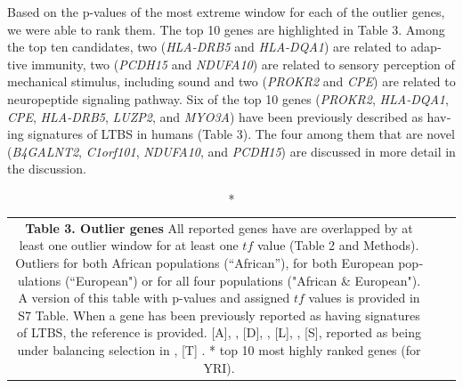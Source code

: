 \begin{refsection}
\begin{otherlanguage}{english}
Based on the p-values of the most extreme window for each of the outlier genes, we were able to rank them. The top 10 genes are highlighted in Table 3. Among the top ten candidates, two (\emph{HLA-DRB5} and \emph{HLA-DQA1}) are related to adaptive immunity, two (\emph{PCDH15} and \emph{NDUFA10}) are related to sensory perception of mechanical stimulus, including sound and two (\emph{PROKR2} and \emph{CPE}) are related to neuropeptide signaling pathway. Six of the top 10 genes (\emph{PROKR2}, \emph{HLA-DQA1}, \emph{CPE}, \emph{HLA-DRB5}, \emph{LUZP2}, and \emph{MYO3A}) have been previously described as having signatures of LTBS in humans (Table 3). The four among them that are novel (\emph{B4GALNT2}, \emph{C1orf101}, \emph{NDUFA10}, and \emph{PCDH15}) are discussed in more detail in the discussion.

\begin{scriptsize}
\begin{longtable}{ccc}
\caption*{\textbf{Table 3. Outlier genes} All reported genes have are overlapped by at least one outlier window for at least one $tf$ value (Table 2 and Methods). Outliers for both African populations (“African”), for both European populations (“European") or for all four populations ("African \& European"). A version of this table with p-values and assigned $tf$ values is provided in S7 Table. When a gene has been previously reported as having signatures of LTBS, the reference is provided. [A], \textcite{Andres2009}, [D], \textcite{DeGiorgio2014}, [L], \textcite{Leffler2013a}, [S], reported as being under balancing selection in \textcite{Savova2016}, [T] \textcite{Tan2005}. * top 10 most highly ranked genes (for YRI).}\\


\end{longtable}
\end{scriptsize}
\end{otherlanguage}
\end{refsection}
